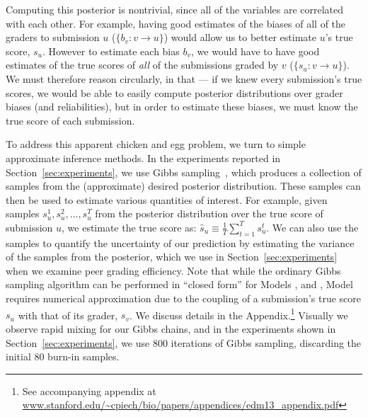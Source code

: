 Computing this posterior is nontrivial, since all of the variables are correlated 
with each other.  For example, having good estimates of the biases of all of the graders to submission $u$ ($\{b_v: v\rightarrow u\}$)
would allow us to better estimate $u$'s true score, $s_u$.  However to estimate each bias $b_v$, we would have to have good estimates of the true scores of \emph{all} of the submissions graded
by $v$ ($\{s_u:v \rightarrow u\}$).
We must therefore reason circularly, in that --- if we knew
every submission's true scores, we would be able to easily compute posterior distributions
over grader biases (and reliabilities), but in order to estimate these biases, we must know
the true score of each submission.  

To address this apparent chicken and egg problem, we turn to simple approximate inference methods. 
In the experiments reported in Section~\ref{sec:experiments}, we use Gibbs sampling~\cite{geman84}, which produces
a collection of samples from the (approximate) desired posterior distribution. These samples can then be used to estimate various 
quantities of interest. For example, given
samples $s^1_u, s^2_u,\dots, s^T_u$ from the posterior distribution over 
the true score of submission $u$, we estimate the true score as: $\hat{s}_u \equiv \frac{1}{T} \sum_{t=1}^T s^t_u$. 
We can also use the samples to quantify the uncertainty of our prediction by estimating the variance of the samples from the
posterior, which we use in Section~\ref{sec:experiments} when we examine peer
grading efficiency. Note that while the ordinary Gibbs sampling algorithm can be performed in ``closed form'' for Models
\PGonebias, \PGone and \PGtwo, Model \PGthree requires numerical approximation due to the coupling of a submission's true
score $s_u$ with that of its grader, $s_v$. 
We discuss details in the Appendix.\footnote{See accompanying appendix at \url{www.stanford.edu/~cpiech/bio/papers/appendices/edm13_appendix.pdf}}  
Visually we observe rapid mixing for our Gibbs chains, and in the experiments shown in Section~\ref{sec:experiments}, we use
800 iterations of Gibbs sampling, discarding the initial 80 burn-in samples. 


